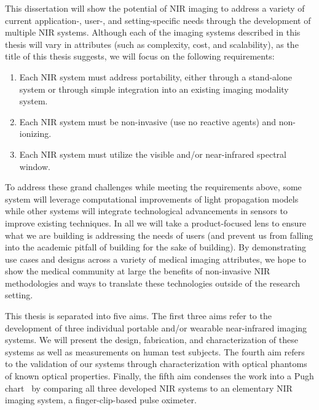 This dissertation will show the potential of \ac{NIR} imaging to address a variety of current application-, user-, and setting-specific needs through the development of multiple \ac{NIR} systems. Although each of the imaging systems described in this thesis will vary in attributes (such as complexity, cost, and scalability), as the title of this thesis suggests, we will focus on the following requirements:
\begin{enumerate}
  \item Each \ac{NIR} system must address portability, either through a stand-alone system or through simple integration into an existing imaging modality system. 
  \item Each \ac{NIR} system must be non-invasive (use no reactive agents) and non-ionizing.
  \item Each \ac{NIR} system must utilize the visible and/or near-infrared spectral window.
\end{enumerate}

To address these grand challenges while meeting the requirements above, some system will leverage computational improvements of light propagation models while other systems will integrate technological advancements in sensors to improve existing techniques. In all we will take a product-focused lens to ensure what we are building is addressing the needs of users (and prevent us from falling into the academic pitfall of building for the sake of building). By demonstrating use cases and designs across a variety of medical imaging attributes, we hope to show the medical community at large the benefits of non-invasive \ac{NIR} methodologies and ways to translate these technologies outside of the research setting. 

This thesis is separated into five aims. The first three aims refer to the development of three individual portable and/or wearable near-infrared imaging systems. We will present the design, fabrication, and characterization of these systems as well as measurements on human test subjects. The fourth aim refers to the validation of our systems through characterization with optical phantoms of known optical properties. Finally, the fifth aim condenses the work into a Pugh chart~\cite{Pugh1981} by comparing all three developed \ac{NIR} systems to an elementary \ac{NIR} imaging system, a finger-clip-based pulse oximeter. 

